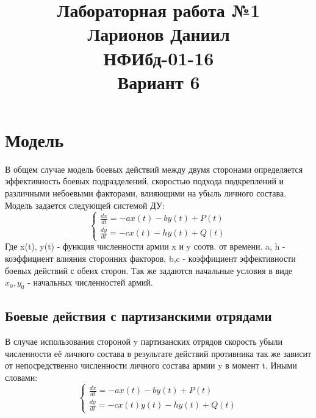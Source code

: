 \documentclass[unicode, 12pt, a4paper,oneside]{article}
\begin{document}
    \title{Лабораторная работа №1\\Ларионов Даниил\\НФИбд-01-16\\Вариант 6}
    \maketitle
    \section{Модель}
    В общем случае модель боевых действий между двумя сторонами определяется эффективность боевых подразделений, скоростью подхода подкреплений и различными небоевыми факторами, влияющими на убыль личного состава. Модель задается следующей системой ДУ: 
    $$
    \begin{cases}
    \frac{dx}{dt} = -ax(t) - by(t) + P(t) \\
    \frac{dy}{dt} = -cx(t) - hy(t) + Q(t)
    \end{cases}
    $$
    Где x(t), y(t) - функция численности армии x и y соотв. от времени. a, h - коэффициент влияния сторонних факторов, b,c - коэффициент эффективности боевых действий с обеих сторон. Так же задаются начальные условия в виде $x_0, y_0$ - начальных численностей армий.
    \subsection{Боевые действия с партизанскими отрядами}
    В случае использования стороной y партизанских отрядов скорость убыли численности её личного состава в результате действий противника так же зависит от непосредственно численности личного состава армии y в момент t. Иными словами:
    $$
    \begin{cases}
    \frac{dx}{dt} = -ax(t) - by(t) + P(t) \\
    \frac{dy}{dt} = -cx(t)y(t) - hy(t) + Q(t)
    \end{cases}
    $$
    
\end{document}
